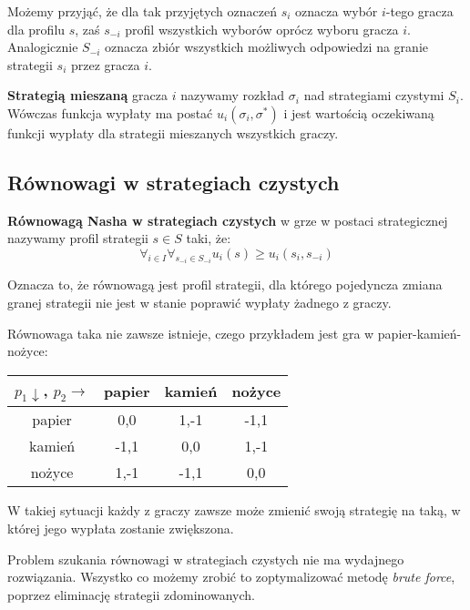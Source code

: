 \documentclass{standalone}
\begin{document}
Możemy przyjąć, że dla tak przyjętych oznaczeń $s_i$ oznacza wybór $i$-tego gracza dla profilu $s$, zaś $s_{-i}$ profil
wszystkich wyborów oprócz wyboru gracza $i$. Analogicznie $S_{-i}$ oznacza zbiór wszystkich możliwych odpowiedzi na granie
strategii $s_i$ przez gracza $i$.

\begin{definition}
\textbf{Strategią mieszaną} gracza $i$ nazywamy rozkład $\sigma_i$ nad strategiami czystymi $S_i$. Wówczas funkcja wypłaty
ma postać $u_i(\sigma_i, \sigma^{*})$ i jest wartością oczekiwaną funkcji wypłaty dla strategii mieszanych wszystkich graczy.
\end{definition}

\subsection{Równowagi w strategiach czystych}

\begin{definition}
\textbf{Równowagą Nasha w strategiach czystych} w grze w postaci strategicznej nazywamy profil strategii $s \in S$ taki, że:
$$\forall_{i \in I} \forall_{s_{-i} \in S_{-i}} u_i(s) \geq u_i(s_i, s_{-i})$$
\end{definition}

Oznacza to, że równowagą jest profil strategii, dla którego pojedyncza zmiana granej strategii nie jest w stanie poprawić wypłaty
żadnego z graczy.

Równowaga taka nie zawsze istnieje, czego przykładem jest gra w papier-kamień-nożyce:

\begin{tabular}[t]{| c | c | c | c |}
\hline
$p_1 \downarrow$, $p_2 \rightarrow$  & papier & kamień & nożyce \\
\hline
papier                               & 0,0    & 1,-1   & -1,1   \\
\hline
kamień                               & -1,1   & 0,0    & 1,-1   \\
\hline
nożyce                               & 1,-1   & -1,1   & 0,0    \\
\hline
\end{tabular}

W takiej sytuacji każdy z graczy zawsze może zmienić swoją strategię na taką, w której jego wypłata zostanie zwiększona.

Problem szukania równowagi w strategiach czystych nie ma wydajnego rozwiązania. Wszystko co możemy zrobić to zoptymalizować
metodę \textit{brute force}, poprzez eliminację strategii zdominowanych.
\end{document}
